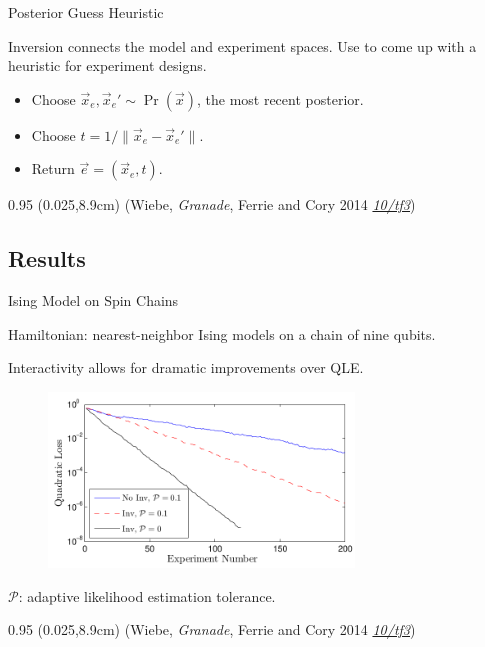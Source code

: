 \documentclass[xcolor=dvipsnames, compress]{beamer}
\renewcommand\UrlFont{\color{red}\rmfamily\itshape}
\newcommand{\shortdoi}[1]{\href{http://doi.org/#1}{\UrlFont 10/#1}}
\newcommand{\bottomnote}[1]{
  \begin{textblock*}{0.95\paperwidth} (0.025\paperwidth,8.9cm)
    {\tiny \hfill #1}
  \end{textblock*}
}
\begin{document}
\begin{frame}{Posterior Guess Heuristic}
 
    Inversion connects the model and experiment spaces.
    Use to come up with a heuristic for experiment designs.
    
    \begin{itemize}
     \item Choose $\vec{x}_e, \vec{x}_e' \sim \Pr(\vec{x})$, the most recent posterior.
     \item Choose $t = 1 / \|\vec{x}_e - \vec{x}_e'\|$.
     \item Return $\vec{e} = (\vec{x}_e, t)$.
    \end{itemize}

  \bottomnote{(Wiebe, \emph{Granade}, Ferrie and Cory 2014 \shortdoi{tf3})}

 
\end{frame}

\subsection{Results}

\begin{frame}{Ising Model on Spin Chains}

    Hamiltonian: nearest-neighbor Ising models on a chain
    of nine qubits.

    Interactivity allows for dramatic improvements over
    QLE.
    
    \begin{figure}
      \includegraphics[width=0.725\textwidth]{poison}
    \end{figure}

    $\mathcal{P}$: adaptive likelihood estimation tolerance.

  \bottomnote{(Wiebe, \emph{Granade}, Ferrie and Cory 2014 \shortdoi{tf3})}

\end{frame}
\end{document}
